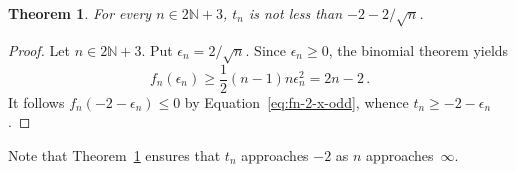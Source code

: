 \documentclass[12pt]{article}
\newcommand{\bN}{\mathbb{N}}
\newtheorem{theorem}{Theorem}
\begin{document}
\begin{theorem} \label{thm:lower-sqrt}
  For every $n \in 2 \bN + 3$, $t_n$ is not less than $- 2 - 2 / \sqrt{n}$.
\end{theorem}

\begin{proof}
  Let $n \in 2 \bN + 3$.
 Put $\epsilon_n = 2 / \sqrt{n}$.
  Since $\epsilon_n \ge 0$,
  the binomial theorem yields
  $$
  f_n(\epsilon_n ) \ge \frac{1}{2} (n - 1) n \epsilon_n^2 = 2 n - 2 \,.
  $$
  It follows $f_n(- 2 - \epsilon_n) \le 0$ by Equation~\eqref{eq:fn-2-x-odd}, whence $t_n \ge - 2 - \epsilon_n$.
\end{proof} 

Note that Theorem~\ref{thm:lower-sqrt} ensures that $t_n$ approaches $- 2$ as $n$ approaches~$\infty$.


 
  
\end{document}
